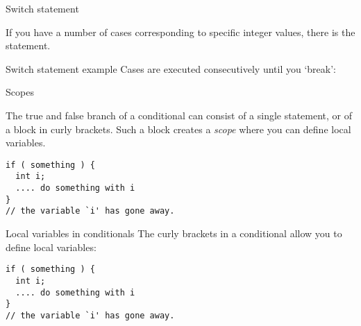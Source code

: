  {Switch statement}

If you have a number of cases corresponding to specific integer
values, there is the  statement.

\begin{block}{Switch statement example}
  \label{sl:switch}
  Cases are executed consecutively until you `break':
\end{block}

 {Scopes}

The true and false branch of a conditional can consist of a single
statement, or of a block in curly brackets. Such a block creates a
%
\emph{scope}
%
where you can define local variables.

\begin{verbatim}
if ( something ) {
  int i; 
  .... do something with i
}
// the variable `i' has gone away.
\end{verbatim}

\begin{slide}{Local variables in conditionals}
  \label{sl:if-scope}
  The curly brackets in a conditional allow you to define local variables:
\begin{verbatim}
if ( something ) {
  int i; 
  .... do something with i
}
// the variable `i' has gone away.
\end{verbatim}
\end{slide}

